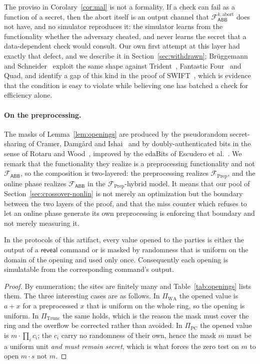 \documentclass[11pt]{article}
\newcommand{\Fabb}{\mathcal{F}_{\mathsf{ABB}}}
\begin{document}
The proviso in Corolary~\ref{cor:mal} is not a formality. If a check can fail as a function of a
secret, then the abort itself is an output channel that $\Fabb^{k,\mathrm{abort}}$ does not
have, and no simulator reproduces it: the simulator learns from the functionality whether the
adversary cheated, and never learns the secret that a data-dependent check would consult. Our
own first attempt at this layer had exactly that defect, and we describe it in
Section~\ref{sec:withdrawn}; Brüggemann and Schneider~\cite{BrueggemannSchneider} exploit the
same shape against Trident~\cite{Trident}, Fantastic Four~\cite{FantasticFour} and Quad, and
identify a gap of this kind in the proof of SWIFT~\cite{SWIFT}, which is evidence that the
condition is easy to violate while believing one has batched a check for efficiency alone.

\paragraph{On the preprocessing.} The masks of Lemma~\ref{lem:openings} are produced by the
pseudorandom secret-sharing of Cramer, Damgård and Ishai~\cite{CramerDamgardIshai} and by
doubly-authenticated bits in the sense of Rotaru and Wood~\cite{RotaruWood}, improved by the
edaBits of Escudero et al.~\cite{EdaBits}. We remark that the functionality they realize is a
preprocessing functionality and not $\Fabb$, so the composition is two-layered: the
preprocessing realizes $\mathcal{F}_{\mathrm{Prep}}$, and the online phase realizes $\Fabb$ in
the $\mathcal{F}_{\mathrm{Prep}}$-hybrid model. It means that our pool of
Section~\ref{sec:crossover-nonlin} is not merely an optimization but the boundary between the
two layers of the proof, and that the miss counter which refuses to let an online phase generate
its own preprocessing is enforcing that boundary and not merely measuring it.

\begin{lemma}
\label{lem:openings}
In the protocols of this artifact, every value opened to the parties is either the output of a
$\mathsf{reveal}$ command or is masked by randomness that is uniform on the domain of the
opening and used only once. Consequently each opening is simulatable from the corresponding
command's output.
\end{lemma}

\begin{proof}
By enumeration; the sites are finitely many and Table~\ref{tab:openings} lists
them. The three interesting cases are as follows. In $\Pi_{\mathrm{WA}}$ the opened value is
$a + x$ for a preprocessed $x$ that is uniform on the whole ring, so the opening is uniform.
In $\Pi_{\mathrm{Trunc}}$ the same holds, which is the reason the mask must cover the ring and
the overflow be corrected rather than avoided. In $\Pi_{\mathrm{PC}}$ the opened value is
$m \cdot \prod_i c_i$; the $c_i$ carry no randomness of their own, hence the mask $m$ must be a
uniform unit \emph{and must remain secret}, which is what forces the zero test on $m$ to open
$m \cdot s$ not $m$.
\end{proof}
\end{document}
